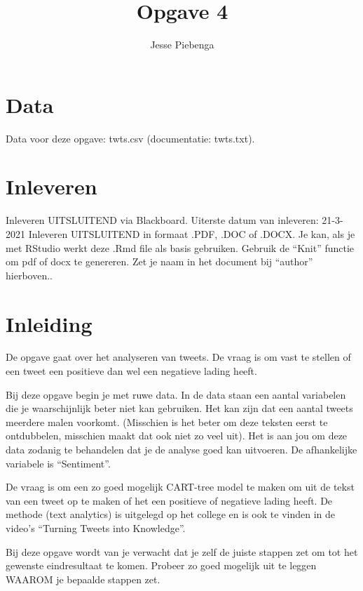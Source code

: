 \documentclass[
]{article}
\title{Opgave 4}
\author{Jesse Piebenga}
\date{}
\begin{document}
\maketitle

\hypertarget{data}{%
\section{Data}\label{data}}

Data voor deze opgave: twts.csv (documentatie: twts.txt).

\hypertarget{inleveren}{%
\section{Inleveren}\label{inleveren}}

Inleveren UITSLUITEND via Blackboard. Uiterste datum van inleveren:
21-3-2021 Inleveren UITSLUITEND in formaat .PDF, .DOC of .DOCX. Je kan,
als je met RStudio werkt deze .Rmd file als basis gebruiken. Gebruik de
``Knit'' functie om pdf of docx te genereren. Zet je naam in het
document bij ``author'' hierboven..

\hypertarget{inleiding}{%
\section{Inleiding}\label{inleiding}}

De opgave gaat over het analyseren van tweets. De vraag is om vast te
stellen of een tweet een positieve dan wel een negatieve lading heeft.

Bij deze opgave begin je met ruwe data. In de data staan een aantal
variabelen die je waarschijnlijk beter niet kan gebruiken. Het kan zijn
dat een aantal tweets meerdere malen voorkomt. (Misschien is het beter
om deze teksten eerst te ontdubbelen, misschien maakt dat ook niet zo
veel uit). Het is aan jou om deze data zodanig te behandelen dat je de
analyse goed kan uitvoeren. De afhankelijke variabele is ``Sentiment''.

De vraag is om een zo goed mogelijk CART-tree model te maken om uit de
tekst van een tweet op te maken of het een positieve of negatieve lading
heeft. De methode (text analytics) is uitgelegd op het college en is ook
te vinden in de video's ``Turning Tweets into Knowledge''.

Bij deze opgave wordt van je verwacht dat je zelf de juiste stappen zet
om tot het gewenste eindresultaat te komen. Probeer zo goed mogelijk uit
te leggen WAAROM je bepaalde stappen zet.
\end{document}
